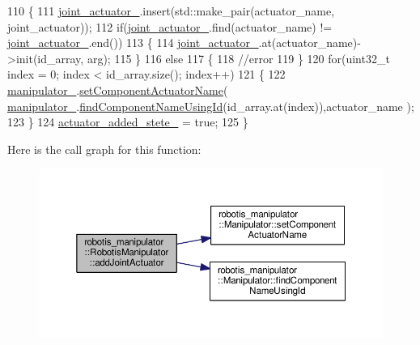 \begin{DoxyCode}
110 \{
111   \hyperlink{classrobotis__manipulator_1_1_robotis_manipulator_a54dfb941bb2682d321daea25a373ab1c}{joint\_actuator\_}.insert(std::make\_pair(actuator\_name, joint\_actuator));
112   \textcolor{keywordflow}{if}(\hyperlink{classrobotis__manipulator_1_1_robotis_manipulator_a54dfb941bb2682d321daea25a373ab1c}{joint\_actuator\_}.find(actuator\_name) != \hyperlink{classrobotis__manipulator_1_1_robotis_manipulator_a54dfb941bb2682d321daea25a373ab1c}{joint\_actuator\_}.end())
113   \{
114     \hyperlink{classrobotis__manipulator_1_1_robotis_manipulator_a54dfb941bb2682d321daea25a373ab1c}{joint\_actuator\_}.at(actuator\_name)->init(id\_array, arg);
115   \}
116   \textcolor{keywordflow}{else}
117   \{
118     \textcolor{comment}{//error}
119   \}
120   \textcolor{keywordflow}{for}(uint32\_t index = 0; index < id\_array.size(); index++)
121   \{
122     \hyperlink{classrobotis__manipulator_1_1_robotis_manipulator_a5b2df4a3b3ee7f408cb1d0eaf61644dc}{manipulator\_}.\hyperlink{classrobotis__manipulator_1_1_manipulator_a27e5f2bca0da521334d59600134bd28b}{setComponentActuatorName}(
      \hyperlink{classrobotis__manipulator_1_1_robotis_manipulator_a5b2df4a3b3ee7f408cb1d0eaf61644dc}{manipulator\_}.\hyperlink{classrobotis__manipulator_1_1_manipulator_a9f8406b7a5be743cc2dfc29a9f7ea647}{findComponentNameUsingId}(id\_array.at(index)),actuator\_name
      );
123   \}
124   \hyperlink{classrobotis__manipulator_1_1_robotis_manipulator_a02073b7982b992642b28acfa35a17769}{actuator\_added\_stete\_} = \textcolor{keyword}{true};
125 \}
\end{DoxyCode}


Here is the call graph for this function\+:\nopagebreak
\begin{figure}[H]
\begin{center}
\leavevmode
\includegraphics[width=350pt]{classrobotis__manipulator_1_1_robotis_manipulator_a31742609d347630169ddc083bb390bb5_cgraph}
\end{center}
\end{figure}


